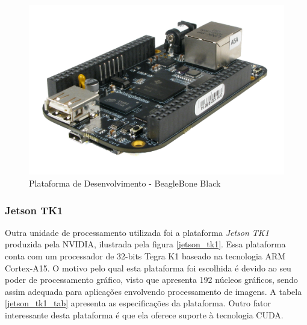 \begin{figure}[H]
	\centering
	\includegraphics[scale=0.26]{./Resources/bbb.jpg}
	\caption{Plataforma de Desenvolvimento - BeagleBone Black}
	\label{bbb}
\end{figure}


\subsubsection{Jetson TK1}

Outra unidade de processamento utilizada foi a plataforma \textit{Jetson TK1} produzida pela NVIDIA, ilustrada pela figura \ref{jetson_tk1}. Essa plataforma conta com um processador de 32-bits Tegra K1 baseado na tecnologia ARM Cortex-A15. O motivo pelo qual esta plataforma foi escolhida é devido ao seu poder de processamento gráfico, visto que apresenta 192 núcleos gráficos, sendo assim adequada para aplicações envolvendo processamento de imagens. A tabela \ref{jetson_tk1_tab} apresenta as especificações da plataforma. Outro fator interessante desta plataforma é que ela oferece suporte à tecnologia CUDA.

